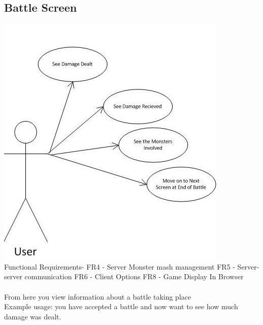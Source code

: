 \documentclass{project}
\begin{document}
\subsection{Battle Screen}
\includegraphics[scale=0.6]{BattleScreenUseCase.jpg}
\\
Functional Requirements-
FR4 - Server Monster mash management
FR5 - Server-server communication
FR6 - Client Options
FR8 - Game Display In Browser
\\
\\
From here you view information about a battle taking place
\\
Example usage: you have accepted a battle and now want to see how much damage was dealt.


\newpage
\end{document}
